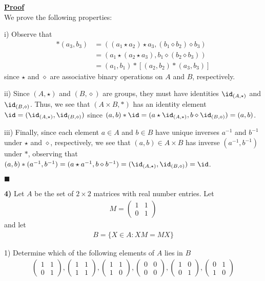 \documentclass[12pt,a4paper]{article}
\newcommand{\prob}[2]{\textbf{#1)} #2}
\newenvironment{proof}
{
\textbf{\underline{Proof}} \\
}
{
\begin{flushright}
$\blacksquare$
\end{flushright}}
\begin{document}
\begin{proof}
We prove the following properties:

i) Observe that 
\begin{align*}
[(a_1,b_1)*(a_2,b_2)]*(a_3,b_3) &= ((a_1 \star a_2)\star a_3, (b_1 \diamond b_2) \diamond b_3) \\
&= (a_1 \star (a_2\star a_3), b_1 \diamond (b_2 \diamond b_3)) \\
&=  (a_1,b_1)*[(a_2,b_2)*(a_3,b_3)]
\end{align*}
since $\star$ and $\diamond$ are associative binary operations on $A$ and $B$, respectively.

ii) Since $(A,\star)$ and $(B,\diamond)$ are groups, they must have identities $\id_{(A,\star)}$ and $\id_{(B,\diamond)}$. Thus, we see that $(A \times B,*)$ has an identity element $\id = (\id_{(A,\star)},\id_{(B,\diamond)})$ since $(a,b) * \id = (a \star \id_{(A,\star)},b \diamond \id_{(B,\diamond)}) = (a,b)$.

iii) Finally, since each element $a \in A$ and $b \in B$ have unique inverses $a^{-1}$ and $b^{-1}$ under $\star$ and $\diamond$, respectively, we see that $(a,b) \in A \times B$ has inverse $(a^{-1},b^{-1})$ under $*$, observing that $(a,b) * (a^{-1},b^{-1}) = (a \star a^{-1},b \diamond b^{-1}) = (\id_{(A,\star)},\id_{(B,\diamond)}) = \id$.
\end{proof}

\prob{4}{Let $A$ be the set of $2 \times 2$ matrices with real number entries. Let
\begin{align*}
M = \begin{pmatrix}
1 & 1 \\
0 & 1
\end{pmatrix}
\end{align*}
and let
\begin{align*}
B = \{X \in A : XM = MX\}
\end{align*}
}

1) Determine which of the following elements of $A$ lies in $B$
\begin{align*}
\begin{pmatrix}
1 & 1 \\
0 & 1
\end{pmatrix}
,
\begin{pmatrix}
1 & 1 \\
1 & 1
\end{pmatrix}
,
\begin{pmatrix}
1 & 1 \\
1 & 0
\end{pmatrix}
,
\begin{pmatrix}
0 & 0 \\
0 & 0
\end{pmatrix}
,
\begin{pmatrix}
1 & 0 \\
0 & 1
\end{pmatrix}
,
\begin{pmatrix}
0 & 1 \\
1 & 0
\end{pmatrix}
\end{align*}
\end{document}
